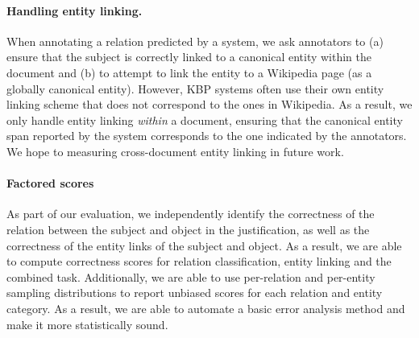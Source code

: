 \paragraph{Handling entity linking.}
When annotating a relation predicted by a system, we ask annotators to (a) ensure that the subject is correctly linked to a canonical entity within the document and (b) to attempt to link the entity to a Wikipedia page (as a globally canonical entity).
However, KBP systems often use their own entity linking scheme that does not correspond to the ones in Wikipedia.
As a result, we only handle entity linking \textit{within} a document, ensuring that the canonical entity span reported by the system corresponds to the one indicated by the annotators.
We hope to measuring cross-document entity linking in future work.

\paragraph{Factored scores}
As part of our evaluation, we independently identify the correctness of the relation between the subject and object in the justification, as well as the correctness of the entity links of the subject and object.
As a result, we are able to compute correctness scores for relation classification, entity linking and the combined task.
Additionally, we are able to use per-relation and per-entity sampling distributions to report unbiased scores for each relation and entity category.
As a result, we are able to automate a basic error analysis method and make it more statistically sound.

